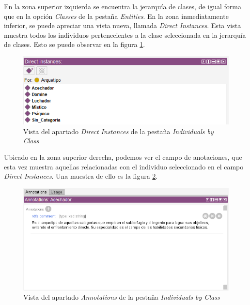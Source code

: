 En la zona superior izquierda se encuentra la jerarquía de clases, de igual forma que en la opción \textit{Classes} de la 
pestaña \textit{Entities}. En la zona inmediatamente inferior, se puede apreciar una vista nueva, llamada \textit{Direct Instances}.
Esta vista muestra todos los individuos pertenecientes a la clase seleccionada en la jerarquía de clases. Esto se puede observar 
en la figura \ref*{IndividualsClass_Instances}.

\begin{figure}[H]
    \centering
    \includegraphics[scale=0.6]{Figures/Protege/IndividualsClass_Instances.png}
    \caption{Vista del apartado \textit{Direct Instances} de la pestaña \textit{Individuals by Class}}
    \label{IndividualsClass_Instances}
\end{figure}

Ubicado en la zona superior derecha, podemos ver el campo de anotaciones, que esta vez muestra aquellas relacionadas 
con el individuo seleccionado en el campo \textit{Direct Instances}. Una muestra de ello es la figura \ref*{IndividualClass_annotations}.

\begin{figure}[ht]
    \centering
    \includegraphics[scale=0.6]{Figures/Protege/IndividualsClass_annotations.png}
    \caption{Vista del apartado \textit{Annotations} de la pestaña \textit{Individuals by Class}}
    \label{IndividualClass_annotations}
\end{figure}


